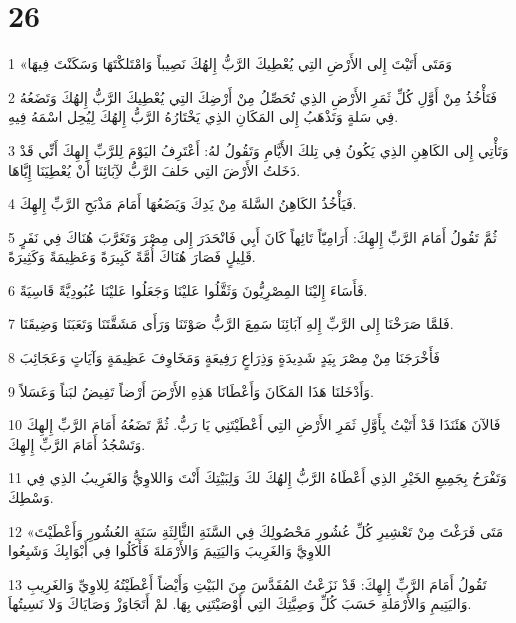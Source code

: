 \chapter{26}

\par 1 «وَمَتَى أَتَيْتَ إِلى الأَرْضِ التِي يُعْطِيكَ الرَّبُّ إِلهُكَ نَصِيباً وَامْتَلكْتَهَا وَسَكَنْتَ فِيهَا
\par 2 فَتَأْخُذُ مِنْ أَوَّلِ كُلِّ ثَمَرِ الأَرْضِ الذِي تُحَصِّلُ مِنْ أَرْضِكَ التِي يُعْطِيكَ الرَّبُّ إِلهُكَ وَتَضَعُهُ فِي سَلةٍ وَتَذْهَبُ إِلى المَكَانِ الذِي يَخْتَارُهُ الرَّبُّ إِلهُكَ لِيُحِل اسْمَهُ فِيهِ.
\par 3 وَتَأْتِي إِلى الكَاهِنِ الذِي يَكُونُ فِي تِلكَ الأَيَّامِ وَتَقُولُ لهُ: أَعْتَرِفُ اليَوْمَ لِلرَّبِّ إِلهِكَ أَنِّي قَدْ دَخَلتُ الأَرْضَ التِي حَلفَ الرَّبُّ لآِبَائِنَا أَنْ يُعْطِيَنَا إِيَّاهَا.
\par 4 فَيَأْخُذُ الكَاهِنُ السَّلةَ مِنْ يَدِكَ وَيَضَعُهَا أَمَامَ مَذْبَحِ الرَّبِّ إِلهِكَ.
\par 5 ثُمَّ تَقُولُ أَمَامَ الرَّبِّ إِلهِكَ: أَرَامِيّاً تَائِهاً كَانَ أَبِي فَانْحَدَرَ إِلى مِصْرَ وَتَغَرَّبَ هُنَاكَ فِي نَفَرٍ قَلِيلٍ فَصَارَ هُنَاكَ أُمَّةً كَبِيرَةً وَعَظِيمَةً وَكَثِيرَةً.
\par 6 فَأَسَاءَ إِليْنَا المِصْرِيُّونَ وَثَقَّلُوا عَليْنَا وَجَعَلُوا عَليْنَا عُبُودِيَّةً قَاسِيَةً.
\par 7 فَلمَّا صَرَخْنَا إِلى الرَّبِّ إِلهِ آبَائِنَا سَمِعَ الرَّبُّ صَوْتَنَا وَرَأَى مَشَقَّتَنَا وَتَعَبَنَا وَضِيقَنَا.
\par 8 فَأَخْرَجَنَا مِنْ مِصْرَ بِيَدٍ شَدِيدَةٍ وَذِرَاعٍ رَفِيعَةٍ وَمَخَاوِفَ عَظِيمَةٍ وَآيَاتٍ وَعَجَائِبَ
\par 9 وَأَدْخَلنَا هَذَا المَكَانَ وَأَعْطَانَا هَذِهِ الأَرْضَ أَرْضاً تَفِيضُ لبَناً وَعَسَلاً.
\par 10 فَالآنَ هَئَنَذَا قَدْ أَتَيْتُ بِأَوَّلِ ثَمَرِ الأَرْضِ التِي أَعْطَيْتَنِي يَا رَبُّ. ثُمَّ تَضَعُهُ أَمَامَ الرَّبِّ إِلهِكَ وَتَسْجُدُ أَمَامَ الرَّبِّ إِلهِكَ.
\par 11 وَتَفْرَحُ بِجَمِيعِ الخَيْرِ الذِي أَعْطَاهُ الرَّبُّ إِلهُكَ لكَ وَلِبَيْتِكَ أَنْتَ وَاللاوِيُّ وَالغَرِيبُ الذِي فِي وَسْطِكَ.
\par 12 «مَتَى فَرَغْتَ مِنْ تَعْشِيرِ كُلِّ عُشُورِ مَحْصُولِكَ فِي السَّنَةِ الثَّالِثَةِ سَنَةِ العُشُورِ وَأَعْطَيْتَ اللاوِيَّ وَالغَرِيبَ وَاليَتِيمَ وَالأَرْمَلةَ فَأَكَلُوا فِي أَبْوَابِكَ وَشَبِعُوا
\par 13 تَقُولُ أَمَامَ الرَّبِّ إِلهِكَ: قَدْ نَزَعْتُ المُقَدَّسَ مِنَ البَيْتِ وَأَيْضاً أَعْطَيْتُهُ لِلاوِيِّ وَالغَرِيبِ وَاليَتِيمِ وَالأَرْمَلةِ حَسَبَ كُلِّ وَصِيَّتِكَ التِي أَوْصَيْتَنِي بِهَا. لمْ أَتَجَاوَزْ وَصَايَاكَ وَلا نَسِيتُهاَ.
